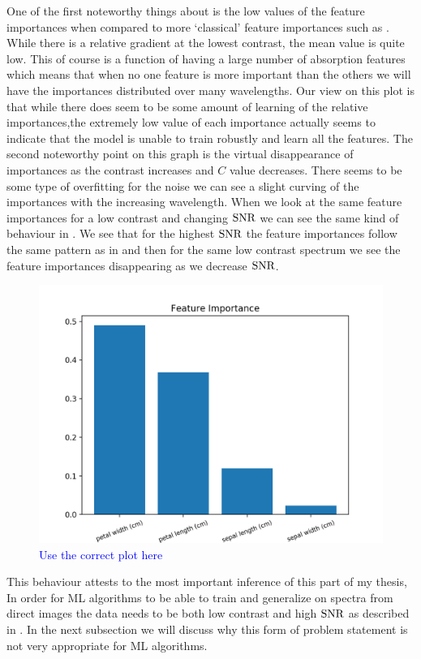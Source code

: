 One of the first noteworthy things about  is the low values of the feature importances when compared to more `classical' feature importances such as . 
While there is a relative gradient at the lowest contrast, the mean value is quite low.
This of course is a function of having a large number of absorption features which means that when no one feature is more important than the others we will have the importances distributed over many wavelengths. 
Our view on this plot is that while there does seem to be some amount of learning of the relative importances,the extremely low value of each importance actually seems to indicate that the model is unable to train robustly and learn all the features.
The second noteworthy point on this graph is the virtual disappearance of importances as the contrast increases and $C$ value decreases.
There seems to be some type of overfitting for the noise we can see a slight curving of the importances with the increasing wavelength.
When we look at the same feature importances for a low contrast and changing $\rm{SNR}$ we can see the same kind of behaviour in .
We see that for the highest $\rm{SNR}$ the feature importances follow the same pattern as in  and then for the same low contrast spectrum we see the feature importances disappearing as we decrease $\rm{SNR}$.
\begin{figure}
    \centering
    \includegraphics[scale=0.5]{images/Chapter3/feature_importances_Randomforest.png}
    \caption{\textcolor{blue}{Use the correct plot here}}
    \label{fig: RF-SNR-featureimportances}
\end{figure}
This behaviour attests to the most important inference of this part of my thesis,
In order for ML algorithms to be able to train and generalize on spectra from direct images the data needs to be both low contrast and high $\rm{SNR}$ as described in .
In the next subsection we will discuss why this form of problem statement is not very appropriate for ML algorithms.


